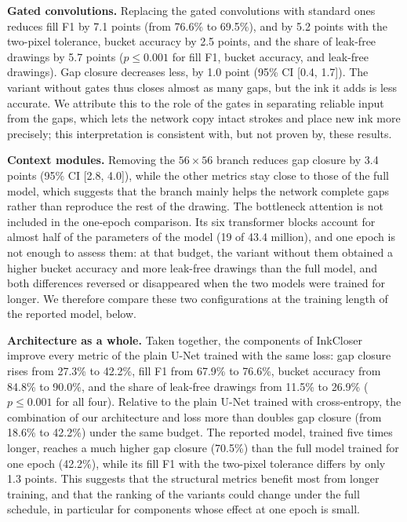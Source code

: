 \documentclass{IEEEcsmag}
\providecommand{\DIFaddtex}[1]{{\color{blue}#1}} %
\providecommand{\DIFaddtex}[1]{\DIFaddtex{#1}} %
\providecommand{\DIFadd}[1]{\texorpdfstring{\DIFaddtex{#1}}{#1}} %
\begin{document}
\DIFadd{\textbf{Gated convolutions.} Replacing the gated convolutions with standard ones
reduces fill F1 by 7.1 points (from 76.6\% to 69.5\%), and by 5.2 points with the
two-pixel tolerance, bucket accuracy by 2.5 points, and the share of leak-free
drawings by 5.7 points ($p \le 0.001$ for fill F1, bucket accuracy, and leak-free
drawings). Gap closure decreases less, by 1.0 point (95\% CI }[\DIFadd{0.4, 1.7}]\DIFadd{). The
variant without gates thus closes almost as many gaps, but the ink it adds is less
accurate. We attribute this to the role of the gates in separating reliable input
from the gaps, which lets the network copy intact strokes and place new ink more
precisely; this interpretation is consistent with, but not proven by, these results.
}

\DIFadd{\textbf{Context modules.} Removing the $56\times 56$ branch reduces gap closure by
3.4 points (95\% CI }[\DIFadd{2.8, 4.0}]\DIFadd{), while the other metrics stay close to those of the
full model, which suggests that the branch mainly helps the network complete gaps
rather than reproduce the rest of the drawing. The bottleneck attention is not
included in the one-epoch comparison. Its six transformer blocks account for almost
half of the parameters of the model (19 of 43.4 million), and one epoch is not
enough to assess them: at that budget, the variant without them obtained a higher
bucket accuracy and more leak-free drawings than the full model, and both
differences reversed or disappeared when the two models were trained for longer. We
therefore compare these two configurations at the training length of the reported
model, below.
}

\DIFadd{\textbf{Architecture as a whole.} Taken together, the components of InkCloser
improve every metric of the plain U-Net trained with the same loss: gap closure
rises from 27.3\% to 42.2\%, fill F1 from 67.9\% to 76.6\%, bucket accuracy from
84.8\% to 90.0\%, and the share of leak-free drawings from 11.5\% to 26.9\%
($p \le 0.001$ for all four). Relative to the plain U-Net trained with
cross-entropy, the combination of our architecture and loss more than doubles gap
closure (from 18.6\% to 42.2\%) under the same budget. The reported model, trained
five times longer, reaches a much higher gap closure (70.5\%) than the full model
trained for one epoch (42.2\%), while its fill F1 with the two-pixel tolerance
differs by only 1.3 points. This suggests that the structural metrics benefit most
from longer training, and that the ranking of the variants could change under the
full schedule, in particular for components whose effect at one epoch is small.
}
\end{document}
